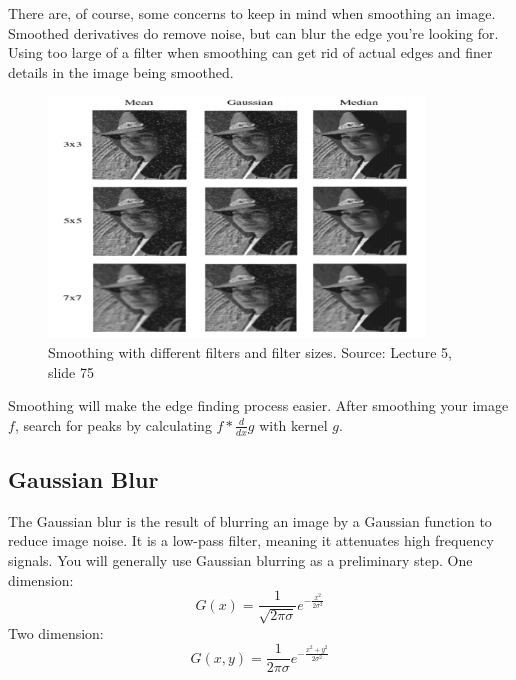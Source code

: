 \documentclass{article}
\begin{document}
There are, of course, some concerns to keep in mind when smoothing an image. Smoothed derivatives do remove noise, but can blur the edge you're looking for. Using too large of a filter when smoothing can get rid of actual edges and finer details in the image being smoothed.

\begin{figure}[H]
\centering
\includegraphics[width=10cm]{seitz_smoothing.png}
\caption{Smoothing with different filters and filter sizes. Source: Lecture 5, slide 75}
\end{figure}


Smoothing will make the edge finding process easier. After smoothing your image $f$, search for peaks by calculating $f * \frac{d}{dx}g$ with kernel $g$.

\subsection{Gaussian Blur}

The Gaussian blur is the result of blurring an image by a Gaussian function to reduce image noise. It is a low-pass filter, meaning it attenuates high frequency signals. You will generally use Gaussian blurring as a preliminary step.
\newline
One dimension:
$$G(x) = \frac{1}{\sqrt{2\pi\sigma}}e^{-\frac{x^2}{2\sigma^2}}$$
Two dimension:
$$G(x,y) = \frac{1}{2\pi\sigma}e^{-\frac{x^2+y^2}{2\sigma^2}}$$
\end{document}
